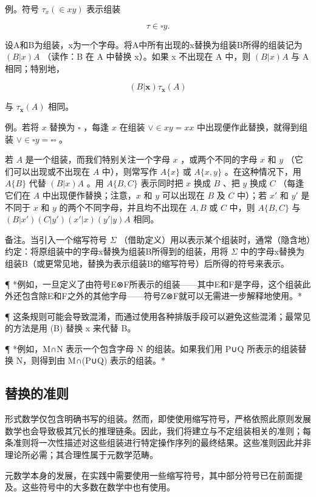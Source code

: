 例。符号 \(\tau_{x}(\in xy)\) 表示组装

\[
\tau \in \square y.
\]

设A和B为组装，x为一个字母。将A中所有出现的x替换为组装B所得的组装记为 \((B|x)A\) （读作：B 在 A 中替换 x）。如果 x 不出现在 A 中，则 \((B|x)A\) 与 A 相同；特别地，

\[
(B | \boldsymbol {x}) \tau_ {\boldsymbol {x}} (A)
\]

与 \(\tau_{\mathbf{x}}(A)\) 相同。

例。若将 \(x\) 替换为 \(\square\) ，每逢 \(x\) 在组装 \(\vee \in xy = xx\) 中出现便作此替换，就得到组装 \(\vee \in \square y = \square \square\) 。

若 \(A\) 是一个组装，而我们特别关注一个字母 \(x\) ，或两个不同的字母 \(x\) 和 \(y\) （它们可以出现或不出现在 \(A\) 中），则常写作 \(A \{x\}\) 或 \(A \{x, y\}\) 。在这种情况下，用 \(A \{B\}\) 代替 \((B|x)A\) 。用 \(A \{B, C\}\) 表示同时把 \(x\) 换成 \(B\) 、把 \(y\) 换成 \(C\) （每逢它们在 \(A\) 中出现便作替换；注意，\(x\) 和 \(y\) 可以出现在 \(B\) 及 \(C\) 中）；若 \(x'\) 和 \(y'\) 是不同于 \(x\) 和 \(y\) 的两个不同字母，并且均不出现在 \(A, B\) 或 \(C\) 中，则 \(A \{B, C\}\) 与 \((B|x') (C|y') (x'|x) (y'|y)A\) 相同。

备注。当引入一个缩写符号 \(\Sigma\) （借助定义）用以表示某个组装时，通常（隐含地）约定：将原组装中的字母x替换为组装B所得到的组装，用将 \(\Sigma\) 中的字母x替换为组装B（或更常见地，替换为表示组装B的缩写符号）后所得的符号来表示。

¶ *例如，一旦定义了由符号E⊗F所表示的组装——其中E和F是字母，这个组装此外还包含除E和F之外的其他字母——符号Z⊗F就可以无需进一步解释地使用。*

¶ 这条规则可能会导致混淆，而通过使用各种排版手段可以避免这些混淆；最常见的方法是用 (B) 替换 x 来代替 B。

¶ *例如，M∩N 表示一个包含字母 N 的组装。如果我们用 P∪Q 所表示的组装替换 N，则得到由 M∩(P∪Q) 表示的组装。*

\subsection{替换的准则}

形式数学仅包含明确书写的组装。然而，即使使用缩写符号，严格依照此原则发展数学也会导致极其冗长的推理链条。因此，我们将建立与不定组装相关的准则；每条准则将一次性描述对这些组装进行特定操作序列的最终结果。这些准则因此并非理论所必需；其合理性属于元数学范畴。

元数学本身的发展，在实践中需要使用一些缩写符号，其中部分符号已在前面提及。这些符号中的大多数在数学中也有使用。

